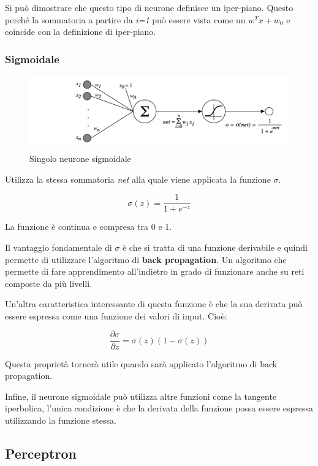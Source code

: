 Si può dimostrare che questo tipo di neurone definisce un iper-piano.
Questo perché la sommatoria a partire da \emph{i=1} può essere vista
come un $w^Tx + w_0$ e coincide con la definizione di iper-piano.

\subsubsection{Sigmoidale}\label{sigmoidale}

\begin{figure}[htbp]
\centering
\includegraphics[width=\textwidth]{./notes/immagini/l9-sigmoidale.png}
\caption{Singolo neurone sigmoidale}
\end{figure}

Utilizza la stessa sommatoria \emph{net} alla quale viene applicata la
funzione $\sigma$.

$$
\sigma(z) = \frac{1}{1 + e^{-z}}
$$

La funzione è continua e compresa tra 0 e 1.

Il vantaggio fondamentale di $\sigma$ è che si tratta di una funzione
derivabile e quindi permette di utilizzare l'algoritmo di \textbf{back
propagation}. Un algoritmo che permette di fare apprendimento
all'indietro in grado di funzionare anche su reti composte da più
livelli.

Un'altra caratteristica interessante di questa funzione è che la sua
derivata può essere espressa come una funzione dei valori di input.
Cioè:

$$
\frac{\partial \sigma}{\partial z} = \sigma(z)(1-\sigma(z))
$$

Questa proprietà tornerà utile quando sarà applicato l'algoritmo di back
propagation.

Infine, il neurone sigmoidale può utilizza altre funzioni come la tangente iperbolica, l'unica condizione
è che la derivata della funzione possa essere espressa utilizzando la funzione stessa.

\subsection{Perceptron}\label{perceptron}


